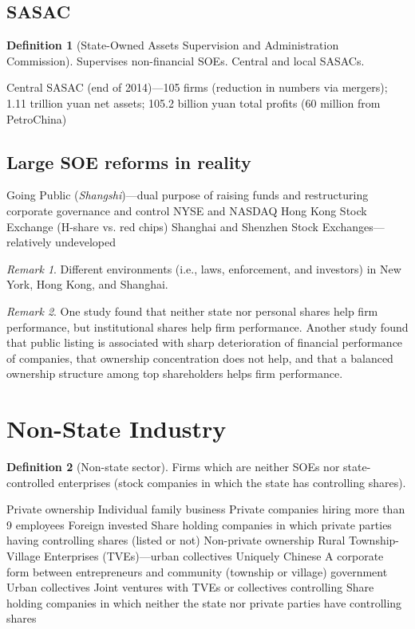 \documentclass[11pt]{article}
\theoremstyle{definition}
\newtheorem{definition}{Definition}[section]
\theoremstyle{remark}
\newtheorem*{remark}{Remark}
\begin{document}
\subsection{SASAC}
\begin{definition}[State-Owned Assets Supervision and Administration Commission]
Supervises non-financial SOEs. Central and local SASACs.
\begin{outline}[enumerate]
\1 Central SASAC (end of 2014)---105 firms (reduction in numbers via mergers); 1.11 trillion yuan net assets; 105.2 billion yuan total profits (60 million from PetroChina)
\end{outline}
\end{definition}

\subsection{Large SOE reforms in reality}
\begin{outline}[enumerate]
\1 Going Public (\textit{Shangshi})---dual purpose of raising funds and restructuring corporate governance and control
	\2 NYSE and NASDAQ
	\2 Hong Kong Stock Exchange (H-share vs. red chips)
	\2 Shanghai and Shenzhen Stock Exchanges---relatively undeveloped
\end{outline}
\begin{remark}
Different environments (i.e., laws, enforcement, and investors) in New York, Hong Kong, and Shanghai. 
\end{remark}

\begin{remark}
One study found that neither state nor personal shares help firm performance, but institutional shares help firm performance. Another study found that public listing is associated with sharp deterioration of financial performance of companies, that ownership concentration does not help, and that a balanced ownership structure among top shareholders helps firm performance.
\end{remark}
\clearpage

\section{Non-State Industry}
\begin{definition}[Non-state sector]
Firms which are neither SOEs nor state-controlled enterprises (stock companies in which the state has controlling shares).
\begin{outline}[enumerate]
\1 Private ownership
	\2 Individual family business
	\2 Private companies hiring more than 9 employees
	\2 Foreign invested
	\2 Share holding companies in which private parties having controlling shares (listed or not)
\1 Non-private ownership
	\2 Rural Township-Village Enterprises (TVEs)---urban collectives
		\3 Uniquely Chinese
		\3 A corporate form between entrepreneurs and community (township or village) government
	\2 Urban collectives
	\2 Joint ventures with TVEs or collectives controlling
	\2 Share holding companies in which neither the state nor private parties have controlling shares
\end{outline}
\end{definition}
\end{document}
